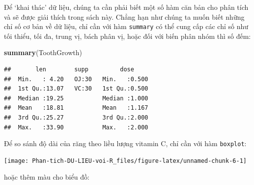 \documentclass[
]{book}
\newenvironment{Shaded}{\begin{snugshade}}{\end{snugshade}}
\newcommand{\DataTypeTok}[1]{\textcolor[rgb]{0.13,0.29,0.53}{#1}}
\newcommand{\KeywordTok}[1]{\textcolor[rgb]{0.13,0.29,0.53}{\textbf{#1}}}
\newcommand{\NormalTok}[1]{#1}
\newcommand{\OperatorTok}[1]{\textcolor[rgb]{0.81,0.36,0.00}{\textbf{#1}}}
\newcommand{\StringTok}[1]{\textcolor[rgb]{0.31,0.60,0.02}{#1}}
\begin{document}
Để `khai thác' dữ liệu, chúng ta cần phải biết một số hàm căn bản cho phân tích và sẽ được giải thích trong sách này. Chẳng hạn như chúng ta muốn biết những chỉ số cơ bản về dữ liệu, chỉ cần với hàm \texttt{summary} có thể cung cấp các chỉ số như tối thiểu, tối đa, trung vị, bách phân vị, hoặc đối với biến phân nhóm thì số đếm:

\begin{Shaded}
\begin{Highlighting}[]
\KeywordTok{summary}\NormalTok{(ToothGrowth)}
\end{Highlighting}
\end{Shaded}

\begin{verbatim}
##       len        supp         dose      
##  Min.   : 4.20   OJ:30   Min.   :0.500  
##  1st Qu.:13.07   VC:30   1st Qu.:0.500  
##  Median :19.25           Median :1.000  
##  Mean   :18.81           Mean   :1.167  
##  3rd Qu.:25.27           3rd Qu.:2.000  
##  Max.   :33.90           Max.   :2.000
\end{verbatim}

Để so sánh độ dài của răng theo liều lượng vitamin C, chỉ cần với hàm \texttt{boxplot}:

\begin{Shaded}
\end{Shaded}

\begin{center}\texttt{[image: Phan-tich-DU-LIEU-voi-R\_files/figure-latex/unnamed-chunk-6-1]} \end{center}

hoặc thêm màu cho biểu đồ:

\begin{Shaded}
\end{Shaded}
\end{document}
